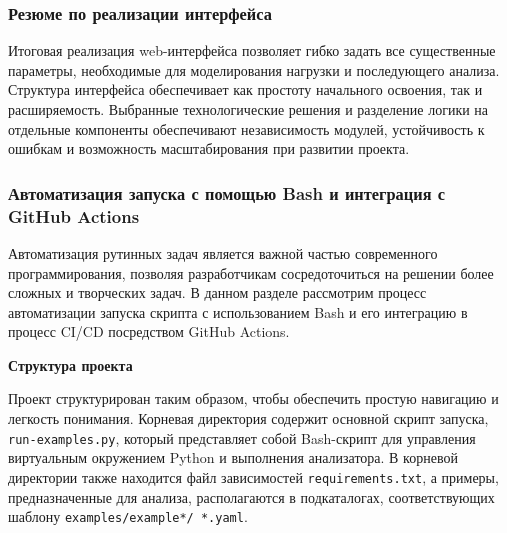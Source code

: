 \subsubsection{Резюме по реализации интерфейса}

Итоговая реализация web-интерфейса позволяет гибко задать все существенные параметры, необходимые для моделирования нагрузки и последующего анализа. Структура интерфейса обеспечивает как простоту начального освоения, так и расширяемость. Выбранные технологические решения и разделение логики на отдельные компоненты обеспечивают независимость модулей, устойчивость к ошибкам и возможность масштабирования при развитии проекта.


\subsubsection{Автоматизация запуска с помощью Bash и интеграция с GitHub Actions}

Автоматизация рутинных задач является важной частью современного программирования, позволяя разработчикам сосредоточиться на решении более сложных и творческих задач. В данном разделе рассмотрим процесс автоматизации запуска скрипта с использованием Bash и его интеграцию в процесс CI/CD посредством GitHub Actions.

\textbf{Структура проекта}

Проект структурирован таким образом, чтобы обеспечить простую навигацию и легкость понимания. Корневая директория содержит основной скрипт запуска, \texttt{run-examples.py}, который представляет собой Bash-скрипт для управления виртуальным окружением Python и выполнения анализатора. В корневой директории также находится файл зависимостей \texttt{requirements.txt}, а примеры, предназначенные для анализа, располагаются в подкаталогах, соответствующих шаблону \texttt{examples/example*/\ *.yaml}.

